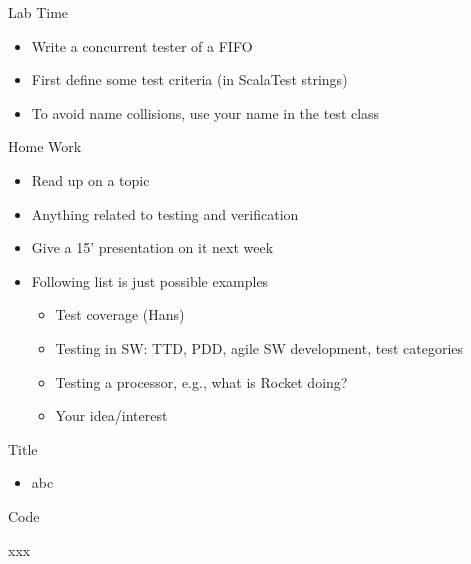 \begin{frame}[fragile]{Lab Time}
\begin{itemize}
\item Write a concurrent tester of a FIFO
\item First define some test criteria (in ScalaTest strings)
\item To avoid name collisions, use your name in the test class
\end{itemize}
\end{frame}

\begin{frame}[fragile]{Home Work}
\begin{itemize}
\item Read up on a topic
\item Anything related to testing and verification
\item Give a 15' presentation on it next week
\item Following list is just possible examples
\begin{itemize}
\item Test coverage (Hans)
\item Testing in SW: TTD, PDD, agile SW development, test categories
\item Testing a processor, e.g., what is Rocket doing?
\item Your idea/interest
\end{itemize}
\end{itemize}
\end{frame}





\begin{frame}[fragile]{Title}
\begin{itemize}
\item abc
\end{itemize}
\end{frame}

\begin{frame}[fragile]{Code}
\begin{chisel}
xxx
\end{chisel}
\end{frame}

